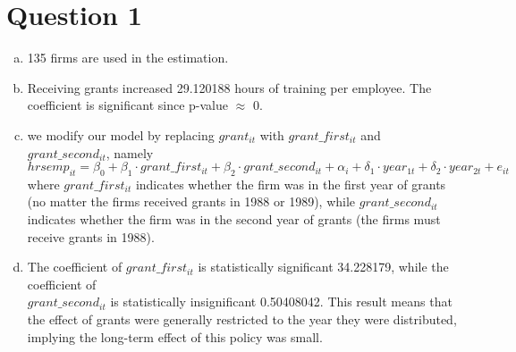 \documentclass[12pt]{article}
\begin{document}
\section*{Question 1}
\begin{enumerate}[(a)]
    \item 135 firms are used in the estimation.
    \item Receiving grants increased  29.120188 hours of training per employee. 
    The coefficient is significant since p-value $\approx$ 0.
    \item we modify our model by replacing $grant_{it}$ with $grant\_first_{it}$ and $grant\_second_{it}$, namely
    $$hrsemp_{it} = \beta_0 + \beta_1 \cdot grant\_first_{it} + \beta_2 \cdot grant\_second_{it} + \alpha_i + \delta_1 \cdot year_{1t} + \delta_2 \cdot year_{2t} + e_{it}$$
    where $grant\_first_{it}$ indicates whether the firm was in the first year of grants (no matter the firms received grants in 1988 or 1989), while $grant\_second_{it}$ indicates whether the firm was in the second year of grants (the firms must receive grants in 1988).
    \item The coefficient of $grant\_first_{it}$ is statistically significant 34.228179, while the coefficient of \\ 
    $grant\_second_{it}$ is statistically insignificant 0.50408042. This result means that the effect of grants were generally restricted to the year they were distributed, 
    implying the long-term effect of this policy was small.
\end{enumerate}
\end{document}
